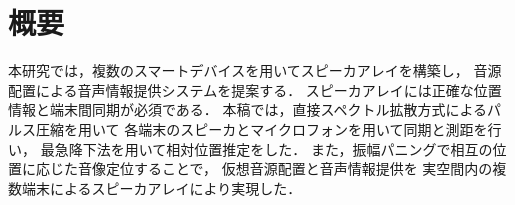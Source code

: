 \chapter*{概要}

本研究では，複数のスマートデバイスを用いてスピーカアレイを構築し，
音源配置による音声情報提供システムを提案する．
スピーカアレイには正確な位置情報と端末間同期が必須である．
本稿では，直接スペクトル拡散方式によるパルス圧縮を用いて
各端末のスピーカとマイクロフォンを用いて同期と測距を行い，
最急降下法を用いて相対位置推定をした．
また，振幅パニングで相互の位置に応じた音像定位することで，
仮想音源配置と音声情報提供を
実空間内の複数端末によるスピーカアレイにより実現した．
